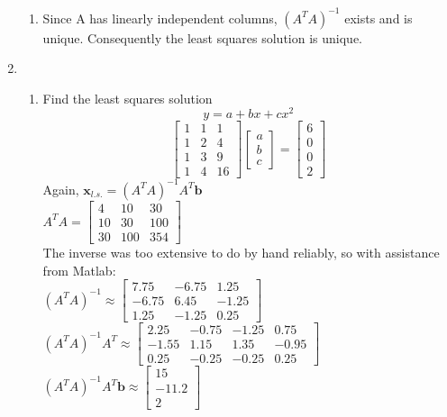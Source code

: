 \documentclass{article}
\begin{document}
\begin{enumerate}
\begin{enumerate}
    \item Since A has linearly independent columns, $(A^TA)^{-1}$ exists and is unique. Consequently the least squares solution is unique.
\end{enumerate}
\par

\item
\begin{enumerate}
    \item Find the least squares solution\\
    $$y = a+bx+cx^2$$
    $$\begin{bmatrix}1&1&1\\1&2&4\\1&3&9\\1&4&16\end{bmatrix}\begin{bmatrix}a\\b\\c\end{bmatrix} = \begin{bmatrix}6\\0\\0\\2\end{bmatrix}$$
    Again, $\textbf{x}_{l.s.}=(A^TA)^{-1}A^T\textbf{b}$\\
    $A^TA = \begin{bmatrix}4&10&30\\10&30&100\\30&100&354\end{bmatrix}$\\
    The inverse was too extensive to do by hand reliably, so with assistance from Matlab: \\
    $(A^TA)^{-1} \approx \begin{bmatrix}7.75&-6.75&1.25\\-6.75&6.45&-1.25\\1.25&-1.25&0.25\end{bmatrix}$\\
    $(A^TA)^{-1}A^T \approx \begin{bmatrix}2.25&-0.75&-1.25&0.75\\-1.55&1.15&1.35&-0.95\\0.25&-0.25&-0.25&0.25\end{bmatrix}$\\
    $(A^TA)^{-1}A^T\textbf{b} \approx \begin{bmatrix}15\\-11.2\\2\end{bmatrix}$\\\\
    

\end{enumerate}
\end{enumerate}
\end{document}
